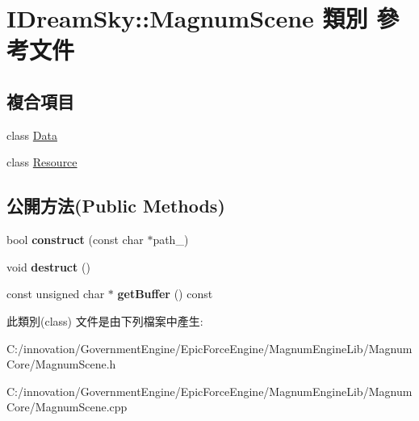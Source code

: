 \hypertarget{class_i_dream_sky_1_1_magnum_scene}{}\section{I\+Dream\+Sky\+:\+:Magnum\+Scene 類別 參考文件}
\label{class_i_dream_sky_1_1_magnum_scene}
\subsection*{複合項目}
\begin{DoxyCompactItemize}
\item 
class \hyperlink{class_i_dream_sky_1_1_magnum_scene_1_1_data}{Data}
\item 
class \hyperlink{class_i_dream_sky_1_1_magnum_scene_1_1_resource}{Resource}
\end{DoxyCompactItemize}
\subsection*{公開方法(Public Methods)}
\begin{DoxyCompactItemize}
\item 
bool {\bfseries construct} (const char $\ast$path\+\_\+)\hypertarget{class_i_dream_sky_1_1_magnum_scene_a35290c3f1433ccf50fc0ffaf10ddcd99}{}\label{class_i_dream_sky_1_1_magnum_scene_a35290c3f1433ccf50fc0ffaf10ddcd99}

\item 
void {\bfseries destruct} ()\hypertarget{class_i_dream_sky_1_1_magnum_scene_abed4830a2c7c95410d0588a0b24cf989}{}\label{class_i_dream_sky_1_1_magnum_scene_abed4830a2c7c95410d0588a0b24cf989}

\item 
const unsigned char $\ast$ {\bfseries get\+Buffer} () const \hypertarget{class_i_dream_sky_1_1_magnum_scene_add732b4394927f7108e54515e1edc524}{}\label{class_i_dream_sky_1_1_magnum_scene_add732b4394927f7108e54515e1edc524}

\end{DoxyCompactItemize}


此類別(class) 文件是由下列檔案中產生\+:\begin{DoxyCompactItemize}
\item 
C\+:/innovation/\+Government\+Engine/\+Epic\+Force\+Engine/\+Magnum\+Engine\+Lib/\+Magnum\+Core/Magnum\+Scene.\+h\item 
C\+:/innovation/\+Government\+Engine/\+Epic\+Force\+Engine/\+Magnum\+Engine\+Lib/\+Magnum\+Core/Magnum\+Scene.\+cpp\end{DoxyCompactItemize}
